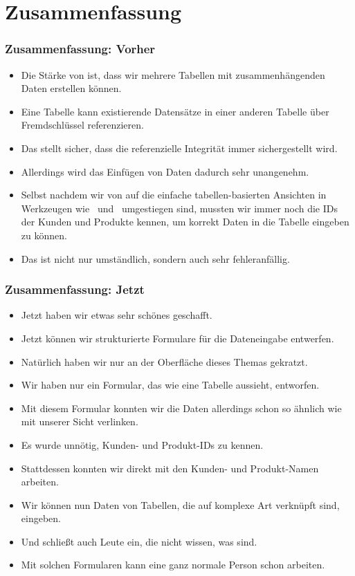 \documentclass[aspectratio=169,mathserif,notheorems]{beamer}%
\begin{document}
\section{Zusammenfassung}%
%
\begin{frame}%
\frametitle{Zusammenfassung: Vorher}%
\begin{itemize}%
\item Die Stärke von  ist, dass wir mehrere Tabellen mit zusammenhängenden Daten erstellen können.%
%
\item<2-> Eine Tabelle kann existierende Datensätze in einer anderen Tabelle über Fremdschlüssel referenzieren.%
%
\item<3-> Das  stellt sicher, dass die referenzielle Integrität immer sichergestellt wird.%
%
\item<4-> Allerdings wird das Einfügen von Daten dadurch sehr unangenehm.%
%
\item<5-> Selbst nachdem wir von  auf die einfache tabellen-basierten Ansichten in Werkzeugen wie \microsoftAccess\ und \libreofficeBase\ umgestiegen sind, mussten wir immer noch die IDs der Kunden und Produkte kennen, um korrekt Daten in die Tabelle  eingeben zu können.%
%
\item<6-> Das ist nicht nur umständlich, sondern auch sehr fehleranfällig.%
\end{itemize}%
\end{frame}%
%
\begin{frame}%
\frametitle{Zusammenfassung: Jetzt}%
\begin{itemize}%
\item Jetzt haben wir etwas sehr schönes geschafft.%
\item<2-> Jetzt können wir strukturierte Formulare für die Dateneingabe entwerfen.%
\item<3-> Natürlich haben wir nur an der Oberfläche dieses Themas gekratzt.%
\item<4-> Wir haben nur ein Formular, das wie eine Tabelle aussieht, entworfen.%
\item<6-> Mit diesem Formular konnten wir die Daten allerdings schon so ähnlich wie mit unserer Sicht  verlinken.%
\item<7-> Es wurde unnötig, Kunden- und Produkt-IDs zu kennen.%
\item<8-> Stattdessen konnten wir direkt mit den Kunden- und Produkt-Namen arbeiten.%
\item<9-> Wir können nun Daten von Tabellen, die auf komplexe Art verknüpft sind, eingeben.%
\item<10-> Und  schließt auch Leute ein, die nicht wissen, was  sind.%
\item<11-> Mit solchen Formularen kann eine ganz normale Person schon arbeiten.%
\end{itemize}%
\end{frame}%
\end{document}
